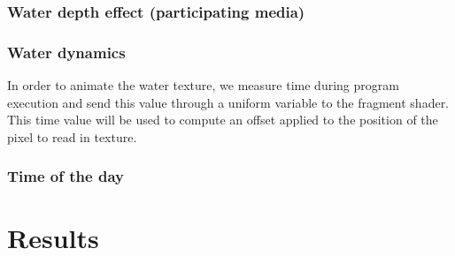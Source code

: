 \documentclass[a4paper,11pt]{article}
\begin{document}
\subsubsection{Water depth effect (participating media)}

\subsubsection{Water dynamics}
In order to animate the water texture, we measure time during program execution and send this value through a uniform variable to the fragment shader. This time value will be used to compute an offset applied to the position of the pixel to read in texture.
\subsubsection{Time of the day}


\section{Results}
\end{document}
